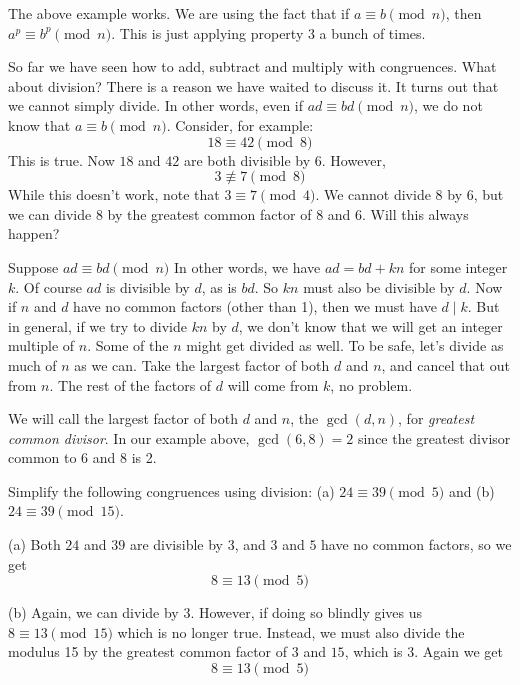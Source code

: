 \documentclass[12pt]{article}
\begin{document}
The above example works.  We are using the fact that if $a \equiv b \pmod n$, then $a^p \equiv b^p \pmod n$.  This is just applying property 3 a bunch of times.

So far we have seen how to add, subtract and multiply with congruences.  What about division?  There is a reason we have waited to discuss it.  It turns out that we cannot simply divide.  In other words, even if $ad \equiv bd \pmod n$, we do not know that $a \equiv b \pmod n$.  Consider, for example:
\[18 \equiv 42 \pmod 8\]
This is true.  Now $18$ and $42$ are both divisible by 6.  However,
\[3 \not\equiv 7 \pmod 8\]
While this doesn't work, note that $3 \equiv 7 \pmod 4$.  We cannot divide $8$ by 6, but we can divide 8 by the greatest common factor of $8$ and $6$.  Will this always happen?

Suppose $ad \equiv bd \pmod n$  In other words, we have $ad = bd + kn$ for some integer $k$.  Of course $ad$ is divisible by $d$, as is $bd$.  So $kn$ must also be divisible by $d$.  Now if $n$ and $d$ have no common factors (other than 1), then we must have $d \mid k$.  But in general, if we try to divide $kn$ by $d$, we don't know that we will get an integer multiple of $n$.  Some of the $n$ might get divided as well.  To be safe, let's divide as much of $n$ as we can.  Take the largest factor of both $d$ and $n$, and cancel that out from $n$.  The rest of the factors of $d$ will come from $k$, no problem.

We will call the largest factor of both $d$ and $n$, the $\gcd(d,n)$, for \emph{greatest common divisor}.  In our example above, $\gcd(6,8) = 2$ since the greatest divisor common to 6 and 8 is 2.


\begin{example}
 Simplify the following congruences using division: (a) $24 \equiv 39 \pmod 5$ and (b) $24 \equiv 39 \pmod{15}$.
 
 \begin{solution}
	(a) Both $24$ and $39$ are divisible by $3$, and $3$ and $5$ have no common factors, so we get
	\[8 \equiv 13 \pmod 5\]
	
	(b) Again, we can divide by 3.  However, if doing so blindly gives us $8 \equiv 13 \pmod{15}$ which is no longer true.  Instead, we must also divide the modulus 15 by the greatest common factor of $3$ and $15$, which is $3$.  Again we get
	\[8 \equiv 13 \pmod 5\]
 \end{solution}
\end{example}
\end{document}
